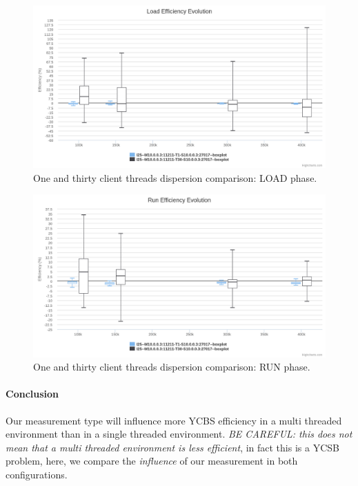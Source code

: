 \documentclass[a4paper,11pt]{report}
\begin{document}
\begin{figure}[ht]
\begin{center}
\includegraphics[width=1\linewidth]{images/evaluation/thread30-SMremote-load.png}
\caption{One and thirty client threads dispersion comparison: LOAD phase.}
\label{thread30-SMremote-load}
\end{center}
\end{figure}

\begin{figure}[ht]
\begin{center}
\includegraphics[width=1\linewidth]{images/evaluation/thread30-SMremote-run.png}
\caption{One and thirty client threads dispersion comparison: RUN phase.}
\label{thread30-SMremote-run}
\end{center}
\end{figure}

\paragraph{Conclusion} Our measurement type will influence more YCBS efficiency in a multi threaded environment than in a single threaded environment. \textit{BE CAREFUL: this does not mean that a multi threaded environment is less efficient}, in fact this is a YCSB problem, here, we compare the \textit{influence} of our measurement in both configurations. 
\end{document}
